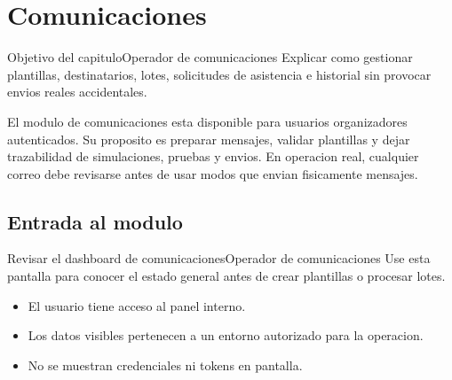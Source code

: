 \chapter{Comunicaciones}
\label{cap:comunicaciones}

\begin{procedimiento}{Objetivo del capitulo}{Operador de comunicaciones}
Explicar como gestionar plantillas, destinatarios, lotes, solicitudes de asistencia e historial sin provocar envios reales accidentales.
\end{procedimiento}

El modulo de comunicaciones esta disponible para usuarios organizadores autenticados. Su proposito es preparar mensajes, validar plantillas y dejar trazabilidad de simulaciones, pruebas y envios. En operacion real, cualquier correo debe revisarse antes de usar modos que envian fisicamente mensajes.

\section{Entrada al modulo}


\begin{procedimiento}{Revisar el dashboard de comunicaciones}{Operador de comunicaciones}
Use esta pantalla para conocer el estado general antes de crear plantillas o procesar lotes.
\end{procedimiento}

\begin{precondiciones}
\begin{itemize}
    \item El usuario tiene acceso al panel interno.
    \item Los datos visibles pertenecen a un entorno autorizado para la operacion.
    \item No se muestran credenciales ni tokens en pantalla.
\end{itemize}
\end{precondiciones}


